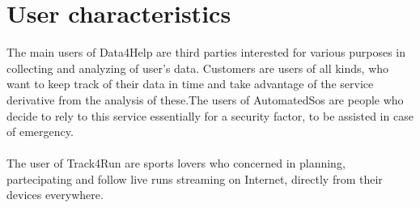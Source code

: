 \section{User characteristics}
The main users of Data4Help are third parties interested for various purposes in collecting and analyzing of user's data.
Customers are users of all kinds, who want to keep track of their data in time and take advantage of the service derivative from the analysis of these.The users of AutomatedSos are people who decide to rely to this service essentially for a security factor, to be assisted in case of emergency.
\\ \\The user of Track4Run are sports lovers who concerned in planning, partecipating and follow live runs streaming on Internet, directly from their devices everywhere. 
 



